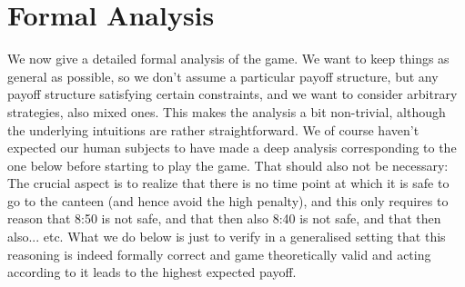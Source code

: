 \section{Formal Analysis} \label{appendix:formal}
We now give a detailed formal analysis of the game. We want to keep things as general as possible, so we don't assume a particular payoff structure, but any payoff structure satisfying certain constraints, and we want to consider arbitrary strategies, also mixed ones. This makes the analysis a bit non-trivial, although the underlying intuitions are rather straightforward. We of course haven't expected our human subjects to have made a deep analysis corresponding to the one below before starting to play the game. That should also not be necessary: The crucial aspect is to realize that there is no time point at which it is safe to go to the canteen (and hence avoid the high penalty), and this only requires to reason that 8{:}50 is not safe, and that then also 8{:}40 is not safe, and that then also... etc. What we do below is just to verify in a generalised setting that this reasoning is indeed formally correct and game theoretically valid and acting according to it leads to the highest expected payoff.  

